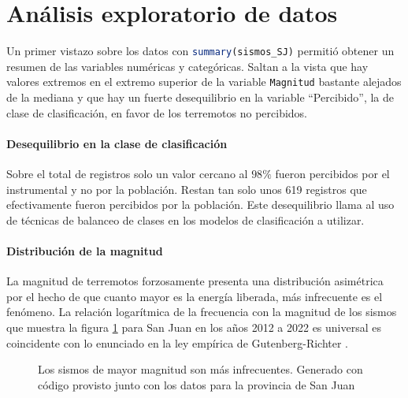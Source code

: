 \documentclass[a4paper]{report}
\begin{document}





\section{Análisis exploratorio de datos}\label{sec:AED}

Un primer vistazo sobre los datos con \lstinline[language = R]'summary(sismos_SJ)' permitió obtener un resumen de las variables numéricas y categóricas.
Saltan a la vista que hay valores extremos en el extremo superior de la variable \lstinline[language = R]'Magnitud' bastante alejados de la mediana y que hay un fuerte desequilibrio en la variable ``Percibido'', la de clase de clasificación, en favor de los terremotos no percibidos.


\paragraph{Desequilibrio en la clase de clasificación}
Sobre el total de registros solo un valor cercano al \(98\%\) fueron percibidos por el instrumental y no por la población.
Restan tan solo unos 619 registros que efectivamente fueron percibidos por la población.
Este desequilibrio llama al uso de técnicas de balanceo de clases en los modelos de clasificación a utilizar.


\paragraph{Distribución de la magnitud}
La magnitud de terremotos forzosamente presenta una distribución asimétrica por el hecho de que cuanto mayor es la energía liberada, más infrecuente es el fenómeno.
La relación logarítmica de la frecuencia con la magnitud de los sismos que muestra la figura \ref{fig:acumulado_anual_magnitud} para San Juan en los años 2012 a 2022 es universal es coincidente con lo enunciado en la ley empírica de Gutenberg-Richter \cite[ec. 4.24]{fowler_solid_1990}.

\begin{figure}[!ht]
\centering

\vspace{-0.8cm}
\caption{Los sismos de mayor magnitud son más infrecuentes. Generado con código provisto junto con los datos para la provincia de San Juan \cite[sección 4.2.1]{daniela_parada_ic-datasets-docencia_nodate}}
\label{fig:acumulado_anual_magnitud}
\end{figure}
\end{document}
